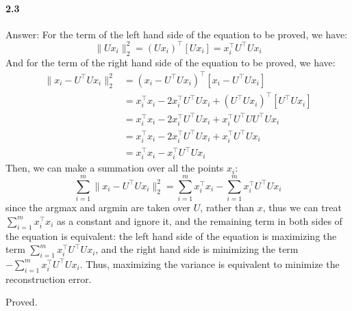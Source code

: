 \documentclass[11pt]{article}
\begin{document}
\paragraph{2.3}
Answer:
\newline
For the term of the left hand side of the equation to be proved, we have:
\begin{equation}
  \|Ux_i\|_2^2 = (Ux_i)^\top[Ux_i] = x_i^\top U^\top U x_i
\end{equation}
And for the term of the right hand side of the equation to be proved, we have:
\begin{equation}
  \begin{split}
    \|x_i - U^\top U x_i\|_2^2 &= (x_i - U^\top U x_i)^\top[x_i - U^\top U x_i] \\
    &= x_i^\top x_i - 2x_i^\top U^\top U x_i + (U^\top U x_i)^\top[U^\top U x_i] \\
    &= x_i^\top x_i - 2x_i^\top U^\top U x_i + x_i^\top U^\top U U^\top U x_i \\
    &= x_i^\top x_i - 2x_i^\top U^\top U x_i + x_i^\top U^\top U x_i \\
    &= x_i^\top x_i - x_i^\top U^\top U x_i 
  \end{split}
\end{equation}
Then, we can make a summation over all the points $x_i$:
\begin{equation}
  \sum_{i=1}^m \|x_i - U^\top U x_i\|_2^2 = \sum_{i=1}^m x_i^\top x_i - \sum_{i=1}^m x_i^\top U^\top U x_i
\end{equation}
since the argmax and argmin are taken over $U$, rather than $x$, thus we can treat $\sum_{i=1}^m x_i^\top x_i$ as a constant and ignore it, and the remaining term in both sides of the equation is equivalent: the left hand side of the equation is maximizing the term $\sum_{i=1}^m x_i^\top U^\top U x_i$, and the right hand side is minimizing the term$-\sum_{i=1}^m x_i^\top U^\top U x_i$.
Thus, maximizing the variance is equivalent to minimize the reconstruction error.

Proved.
\end{document}
